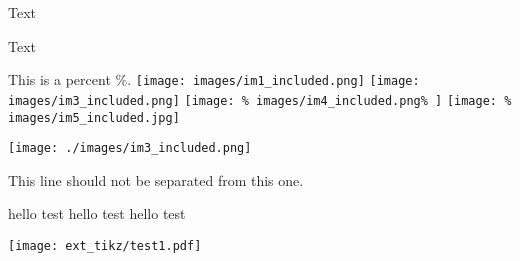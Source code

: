 
Text

Text%


This is a percent \%.
\texttt{[image: images/im1\_included.png]}
\texttt{[image: images/im3\_included.png]}
\texttt{[image: \%
  images/im4\_included.png\%
  ]}
\texttt{[image: \%
  images/im5\_included.jpg]}

\texttt{[image: ./images/im3\_included.png]}

This line should not be separated
%
from this one.



\newif\ifvar

\ifvar
\fi

\newcommand{\red}[1]{{\color{red} #1}}
hello test hello
test hello
test




\texttt{[image: ext\_tikz/test1.pdf]}






